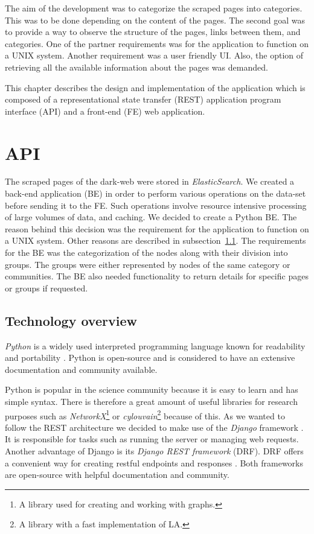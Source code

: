 \label{developmentIntroduction}
The aim of the development was to categorize the scraped pages into categories. This was to be done depending on the content of the pages. The second goal was to provide a way to observe the structure of the pages, links between them, and categories. One of the partner requirements was for the application to function on a UNIX system. Another requirement was a user friendly UI. Also, the option of retrieving all the available information about the pages was demanded. 

This chapter describes the design and implementation of the application which is composed of a representational state transfer (REST) application program interface (API) and a front-end (FE) web application. 

\section{API}
The scraped pages of the dark-web were stored in \textit{ElasticSearch}. We created a back-end application (BE) in order to perform various operations on the data-set before sending it to the FE. Such operations involve resource intensive processing of large volumes of data, and caching. We decided to create a Python BE. The reason behind this decision was the requirement for the application to function on a UNIX system. Other reasons are described in subsection~\ref{technologyOverwiew}. The requirements for the BE was the categorization of the nodes along with their division into groups. The groups were either represented by nodes of the same category or communities. The BE also needed functionality to return details for specific pages or groups if requested.
\subsection{Technology overview}
\label{technologyOverwiew}
\textit{Python} is a widely used interpreted programming language known for readability and portability \cite{aboutPython}. Python is open-source and is considered to have an extensive documentation and community available. 

Python is popular in the science community because it is easy to learn and has simple syntax. There is therefore a great amount of useful libraries for research purposes such as \textit{NetworkX}\footnote{A library used for creating and working with graphs.} \cite{networkX} or \textit{cylouvain}\footnote{A library with a fast implementation of LA.} \cite{cylouvain} because of this.  
As we wanted to follow the REST architecture we decided to make use of the \textit{Django} framework \cite{meetDjango}. It is responsible for tasks such as running the server or managing web requests. Another advantage of Django is its \textit{Django REST framework} (DRF). DRF offers a convenient way for creating restful endpoints and responses \cite{djangoRest}. Both frameworks are open-source with helpful documentation and community. 

